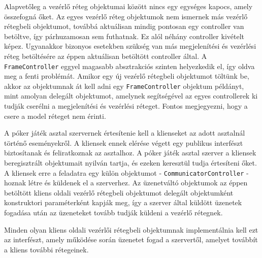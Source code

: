 Alapvetőleg a vezérlő réteg objektumai között nincs egy egységes kapocs, amely összefogná őket. Az egyes vezérlő réteg objektumok nem ismernek más vezérlő rétegbeli objektumot, továbbá aktuálisan mindig pontosan egy controller van betöltve, így párhuzamosan sem futhatnak. Ez alól néhány controller kivételt képez. Ugyanakkor bizonyos esetekben szükség van más megjelenítési és vezérlési réteg betöltésére az éppen aktuálisan betöltött controller által. A \texttt{FrameController} eggyel magasabb absztrakciós szinten helyezkedik el, így oldva meg a fenti problémát. Amikor egy új vezérlő rétegbeli objektumot töltünk be, akkor az objektumnak át kell adni egy \texttt{FrameController} objektum példányt, mint amolyan delegált objektumot, amelynek segítségével az egyes controllerek ki tudják cserélni a megjelenítési és vezérlési réteget. Fontos megjegyezni, hogy a csere a model réteget nem érinti.

A póker játék asztal szervernek értesítenie kell a klienseket az adott asztalnál történő eseményekről. A kliensek ennek elérése végett egy publikus interfészt biztosítanak és feliratkoznak az asztalhoz. A póker játék asztal szerver a kliensek beregisztrált objektumait nyilván tartja, és ezeken keresztül tudja értesíteni őket. A kliensek erre a feladatra egy külön objektumot - \texttt{CommunicatorController} - hoznak létre és küldenek el a szerverhez. Az üzenetváltó objektumok az éppen betöltött kliens oldali vezérlő rétegbeli objektumot delegált objektumként konstruktori paraméterként kapják meg, így a szerver által küldött üzenetek fogadása után az üzeneteket tovább tudják küldeni a vezérlő rétegnek.

Minden olyan kliens oldali vezérlői rétegbeli objektumnak implementálnia kell ezt az interfészt, amely működése során üzenetet fogad a szervertől, amelyet továbbít a kliens további rétegeinek.

